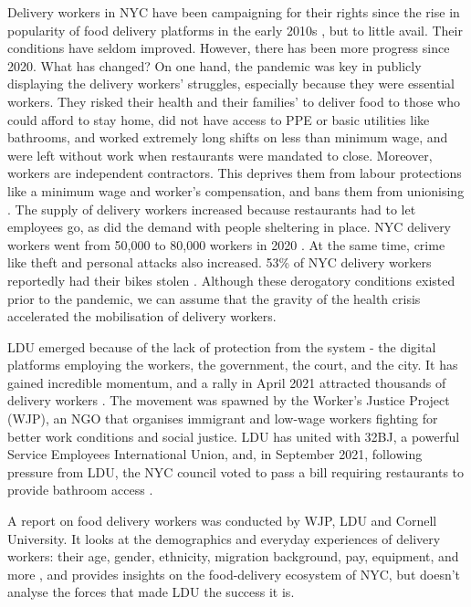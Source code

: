 \documentclass{article}
\begin{document}
Delivery workers in NYC have been campaigning for their rights since the rise in popularity of food delivery platforms in the early 2010s \parencite{TODO}, but to little avail. Their conditions have seldom improved. However, there has been more progress since 2020. What has changed? On one hand, the pandemic was key in publicly displaying the delivery workers’ struggles, especially because they were essential workers. 
They risked their health and their families’ to deliver food to those who could afford to stay home, did not have access to PPE or basic utilities like bathrooms, and worked extremely long shifts on less than minimum wage, and were left without work when restaurants were mandated to close. 
Moreover, workers are independent contractors. This deprives them from labour protections like a minimum wage and worker’s compensation, and bans them from unionising \parencite{dunn2019hustle}.
The supply of delivery workers increased because restaurants had to let employees go, as did the demand with people sheltering in place. NYC delivery workers went from 50,000 to 80,000 workers in 2020 \parencite{TODO}. At the same time, crime like theft and personal attacks also increased. 53\% of NYC delivery workers reportedly had their bikes stolen \parencite{brictv}.
Although these derogatory conditions existed prior to the pandemic, we can assume that the gravity of the health crisis accelerated the mobilisation of delivery workers.

LDU emerged because of the lack of protection from the system \parencite{TODO} - the digital platforms employing the workers, the government, the court, and the city. It has gained incredible momentum, and a rally in April 2021 attracted thousands of delivery workers \parencite{aponte_2021}. The movement was spawned by the Worker’s Justice Project (WJP), an NGO that organises immigrant and low-wage workers fighting for better work conditions and social justice. 
LDU has united with 32BJ, a powerful Service Employees International Union, and, in September 2021, following pressure from LDU, the NYC council voted to pass a bill requiring restaurants to provide bathroom access \parencite{vice2021bathroom}.

A report on food delivery workers was conducted by WJP, LDU and Cornell University. It looks at the demographics and everyday experiences of delivery workers: their age, gender, ethnicity, migration background, pay, equipment, and more \parencite{ldu_report2021}, and provides insights on the food-delivery ecosystem of NYC, but doesn’t analyse the forces that made LDU the success it is.
\end{document}
